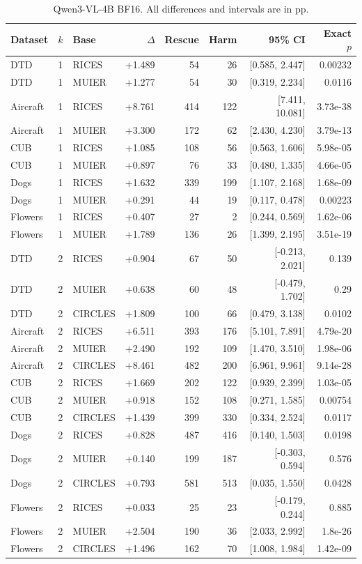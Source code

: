 \documentclass[10pt,twocolumn,letterpaper]{article}
\begin{document}
\begin{table}[t]
\caption{Qwen3-VL-4B BF16. All differences and intervals are in pp.}
\label{sup:paired_0}
\centering\small
\begin{tabular}{lllrrrrr}
\toprule
Dataset & $k$ & Base & $\Delta$ & Rescue & Harm & 95\% CI & Exact $p$ \\
\midrule
DTD & 1 & RICES & +1.489 & 54 & 26 & [0.585, 2.447] & 0.00232 \\
DTD & 1 & MUIER & +1.277 & 54 & 30 & [0.319, 2.234] & 0.0116 \\
Aircraft & 1 & RICES & +8.761 & 414 & 122 & [7.411, 10.081] & 3.73e-38 \\
Aircraft & 1 & MUIER & +3.300 & 172 & 62 & [2.430, 4.230] & 3.79e-13 \\
CUB & 1 & RICES & +1.085 & 108 & 56 & [0.563, 1.606] & 5.98e-05 \\
CUB & 1 & MUIER & +0.897 & 76 & 33 & [0.480, 1.335] & 4.66e-05 \\
Dogs & 1 & RICES & +1.632 & 339 & 199 & [1.107, 2.168] & 1.68e-09 \\
Dogs & 1 & MUIER & +0.291 & 44 & 19 & [0.117, 0.478] & 0.00223 \\
Flowers & 1 & RICES & +0.407 & 27 & 2 & [0.244, 0.569] & 1.62e-06 \\
Flowers & 1 & MUIER & +1.789 & 136 & 26 & [1.399, 2.195] & 3.51e-19 \\
DTD & 2 & RICES & +0.904 & 67 & 50 & [-0.213, 2.021] & 0.139 \\
DTD & 2 & MUIER & +0.638 & 60 & 48 & [-0.479, 1.702] & 0.29 \\
DTD & 2 & CIRCLES & +1.809 & 100 & 66 & [0.479, 3.138] & 0.0102 \\
Aircraft & 2 & RICES & +6.511 & 393 & 176 & [5.101, 7.891] & 4.79e-20 \\
Aircraft & 2 & MUIER & +2.490 & 192 & 109 & [1.470, 3.510] & 1.98e-06 \\
Aircraft & 2 & CIRCLES & +8.461 & 482 & 200 & [6.961, 9.961] & 9.14e-28 \\
CUB & 2 & RICES & +1.669 & 202 & 122 & [0.939, 2.399] & 1.03e-05 \\
CUB & 2 & MUIER & +0.918 & 152 & 108 & [0.271, 1.585] & 0.00754 \\
CUB & 2 & CIRCLES & +1.439 & 399 & 330 & [0.334, 2.524] & 0.0117 \\
Dogs & 2 & RICES & +0.828 & 487 & 416 & [0.140, 1.503] & 0.0198 \\
Dogs & 2 & MUIER & +0.140 & 199 & 187 & [-0.303, 0.594] & 0.576 \\
Dogs & 2 & CIRCLES & +0.793 & 581 & 513 & [0.035, 1.550] & 0.0428 \\
Flowers & 2 & RICES & +0.033 & 25 & 23 & [-0.179, 0.244] & 0.885 \\
Flowers & 2 & MUIER & +2.504 & 190 & 36 & [2.033, 2.992] & 1.8e-26 \\
Flowers & 2 & CIRCLES & +1.496 & 162 & 70 & [1.008, 1.984] & 1.42e-09 \\
\bottomrule
\end{tabular}
\end{table}
\end{document}
